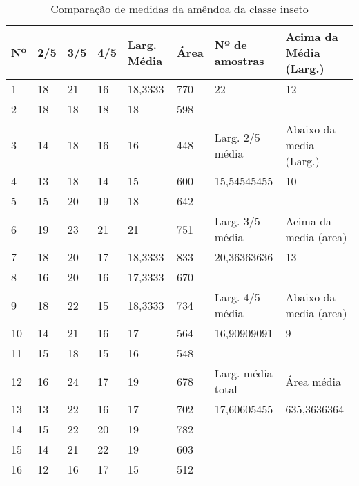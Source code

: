 \begin{anexosenv}
\begin{table}[hbtp!]
\centering
\caption{Comparação de medidas da amêndoa da classe inseto}
\label{tab:medidas_classe_inseto}
\begin{tabular}{|l|l|l|l|l|l|l|l|}
\hline
Nº & 2/5 & 3/5 & 4/5 & Larg. Média & Área & Nº de amostras & Acima da Média (Larg.) \\ \hline
1  & 18  & 21  & 16  & 18,3333     & 770  & 22               & 12                     \\
2  & 18  & 18  & 18  & 18          & 598  &                  &                        \\\cline{7-8}
3  & 14  & 18  & 16  & 16          & 448  & \multicolumn{1}{l|}{Larg. 2/5 média}   & \multicolumn{1}{l|}{Abaixo da media (Larg.)} \\\cline{7-8}
4  & 13  & 18  & 14  & 15          & 600  & 15,54545455      & 10                     \\
5  & 15  & 20  & 19  & 18          & 642  &                  &                        \\\cline{7-8}
6  & 19  & 23  & 21  & 21          & 751  & \multicolumn{1}{l|}{Larg. 3/5 média}   & \multicolumn{1}{l|}{Acima da media (area)}  \\\cline{7-8}
7  & 18  & 20  & 17  & 18,3333     & 833  & 20,36363636      & 13                     \\
8  & 16  & 20  & 16  & 17,3333     & 670  &                  &                        \\\cline{7-8}
9  & 18  & 22  & 15  & 18,3333     & 734  & \multicolumn{1}{l|}{Larg. 4/5 média}   & \multicolumn{1}{l|}{Abaixo da media (area)} \\\cline{7-8}
10 & 14  & 21  & 16  & 17          & 564  & 16,90909091      & 9                      \\
11 & 15  & 18  & 15  & 16          & 548  &                  &                        \\\cline{7-8}
12 & 16  & 24  & 17  & 19          & 678  & Larg. média total & \multicolumn{1}{l|}{Área média}             \\\cline{7-8}
13 & 13  & 22  & 16  & 17          & 702  & 17,60605455      & 635,3636364            \\
14 & 15  & 22  & 20  & 19          & 782  &                  &                        \\
15 & 14  & 21  & 22  & 19          & 603  &                  &                        \\
16 & 12  & 16  & 17  & 15          & 512  &                  &                        \\

\end{tabular}
\end{table}
\end{anexosenv}
